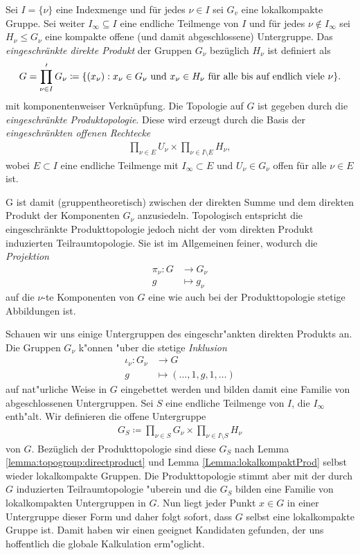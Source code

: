 		\begin{defi}
			Sei $I=\{\nu\}$ eine Indexmenge und für jedes $\nu \in I$ sei $G_v$ eine lokalkompakte Gruppe. 
			Sei weiter $I_\infty \subseteq I$ eine endliche Teilmenge von $I$ und für jedes $\nu \notin I_\infty$ sei $H_\nu\leq G_\nu$ eine kompakte offene (und damit abgeschlossene) Untergruppe. 
			Das \emph{eingeschränkte direkte Produkt} der Gruppen $G_\nu$ bezüglich $H_\nu$ ist definiert als 
			\begin{align*}
				G = \prod\limits_{\nu \in I}' G_\nu \coloneqq  \{ (x_\nu): x_\nu \in G_\nu \text{ und } x_\nu \in H_\nu \text{ für alle bis auf endlich viele } \nu \}.
			\end{align*}
			mit komponentenweiser Verknüpfung. Die Topologie auf $G$ ist gegeben durch die \emph{eingeschränkte Produktopologie}. 
			Diese wird erzeugt durch die Basis der \emph{eingeschränkten offenen Rechtecke}
			\begin{align*}
				\prod_{\nu\in E} U_\nu \times \prod_{\nu\in I\setminus E} H_\nu,
			\end{align*}
			wobei $E \subset I$ eine endliche Teilmenge mit $I_\infty \subset E$ und $U_\nu \in G_\nu$ offen für alle $\nu\in E$ ist.
		\end{defi}
		G ist damit (gruppentheoretisch) zwischen der direkten Summe und dem direkten Produkt der Komponenten $G_\nu$ anzusiedeln.
		Topologisch entspricht die eingeschränkte Produkttopologie jedoch nicht der vom direkten Produkt induzierten Teilraumtopologie.
		Sie ist im Allgemeinen feiner, wodurch die \emph{Projektion}
		\begin{align*}
			\pi_\nu: G &\to G_\nu\\
					g  &\mapsto g_\nu
		\end{align*}
		auf die $\nu$-te Komponenten von $G$ eine wie auch bei der Produkttopologie stetige Abbildungen ist.
		
		Schauen wir uns einige Untergruppen des eingeschr"ankten direkten Produkts an.
		Die Gruppen $G_\nu$ k"onnen "uber die stetige \emph{Inklusion} 
		\begin{align*}
			\iota_\nu: G_\nu &\to G \\
					g &\mapsto (\dots,1,g,1,\dots)
		\end{align*}
		auf nat"urliche Weise in $G$ eingebettet werden und bilden damit eine Familie von abgeschlossenen Untergruppen.
		Sei $S$ eine endliche Teilmenge von $I$, die $I_\infty$ enth"alt. 
		Wir definieren die offene Untergruppe
		\begin{align*}
			G_S \coloneqq  \prod_{\nu\in S}G_\nu \times \prod_{\nu\in I\setminus S} H_\nu
		\end{align*}
		von $G$. 
		Bezüglich der Produkttopologie sind diese $G_S$ nach Lemma \ref{lemma:topogroup:directproduct} und Lemma \ref{Lemma:lokalkompaktProd} selbst wieder lokalkompakte Gruppen.
		Die Produkttopologie stimmt aber mit der durch $G$ induzierten Teilraumtopologie "uberein und die $G_S$ bilden eine Familie von lokalkompakten Untergruppen in $G$.
		Nun liegt jeder Punkt $x \in G$ in einer Untergruppe dieser Form und daher folgt sofort, dass $G$ selbst eine lokalkompakte Gruppe ist.
		Damit haben wir einen geeignet Kandidaten gefunden, der uns hoffentlich die globale Kalkulation erm"oglicht.
		
